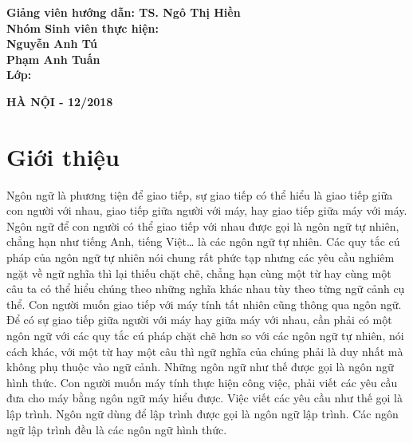 \documentclass[14pt]{extreport}
\begin{document}
{\begin{center}
\end{center}
\begin{flushleft}
\vspace{1.3cm}
\hspace{1.5cm} \textbf{ Giảng viên hướng dẫn:{ TS. Ngô Thị Hiền }}\\[0.2cm]
\hspace{1.5cm} \textbf{ Nhóm Sinh viên thực hiện:}\\[0.2cm]
\hspace{5cm}\textbf{Nguyễn Anh Tú}\\[0.2cm]
\hspace{5cm}\textbf{Phạm Anh Tuấn}\\[0.2cm]
\hspace{1.5cm} \textbf{ Lớp:\hspace{2cm}{ KSTN Toán Tin K60}}\\
\end{flushleft}

\begin{center}
\textbf{{\small HÀ NỘI - 12/2018}}\\
\end{center}
 }
\thispagestyle{empty}
\newpage

\tableofcontents
\newpage


\newpage

\chapter{Giới thiệu}
Ngôn ngữ là phương tiện để giao tiếp, sự giao tiếp có thể hiểu là giao tiếp giữa con người với nhau, giao tiếp giữa người với máy, hay giao tiếp giữa máy với máy. Ngôn ngữ để con người có thể giao tiếp với nhau được gọi là ngôn ngữ tự nhiên, chẳng hạn như tiếng Anh, tiếng Việt… là các ngôn ngữ tự nhiên. Các quy tắc cú pháp của ngôn ngữ tự nhiên nói chung rất phức tạp nhưng các yêu cầu nghiêm ngặt về ngữ nghĩa thì lại thiếu chặt chẽ, chẳng hạn cùng một từ hay cùng một câu ta có thể hiểu chúng theo những nghĩa khác nhau tùy theo từng ngữ cảnh cụ thể. Con người muốn giao tiếp với máy tính tất nhiên cũng thông qua ngôn ngữ. Để có sự giao tiếp giữa người với máy hay giữa máy với nhau, cần phải có một ngôn ngữ với các quy tắc cú pháp chặt chẽ hơn so với các ngôn ngữ tự nhiên, nói cách khác, với một từ hay một câu thì ngữ nghĩa của chúng phải là duy nhất mà không phụ thuộc vào ngữ cảnh. Những ngôn ngữ như thế được gọi là ngôn ngữ hình thức. Con người muốn máy tính thực hiện công việc, phải viết các yêu cầu đưa cho máy bằng ngôn ngữ máy hiểu được. Việc viết các yêu cầu như thế gọi là lập trình. Ngôn ngữ dùng để lập trình được gọi là ngôn ngữ lập trình. Các ngôn ngữ lập trình đều là các ngôn ngữ hình thức. 
\end{document}
